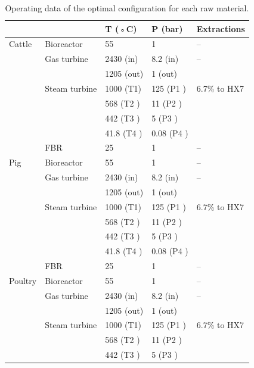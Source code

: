 \begin{refsection}[referencesCh2]
\begin{table}[h!]
	\centering
	\caption{Operating data of the optimal configuration for each raw material.}
	\label{table:Table4}
	\begin{tabular}{@{}lllll@{}}
		\toprule
		&               & T (◦C)      & P (bar)    & Extractions  \\ \midrule
		Cattle  & Bioreactor    & 55          & 1          & –            \\
		& Gas turbine   & 2430 (in)   & 8.2 (in)   & –            \\
		&               & 1205 (out)  & 1 (out)    &              \\
		& Steam turbine & 1000 (T1)   & 125 (P1 )  & 6.7\% to HX7 \\
		&               & 568 (T2 )   & 11 (P2 )   &              \\
		&               & 442 (T3 )   & 5 (P3 )    &              \\
		&               & 41.8 (T4 )  & 0.08 (P4 ) &              \\
		& FBR           & 25          & 1          & –            \\
		Pig     & Bioreactor    & 55          & 1          & –            \\
		& Gas turbine   & 2430 (in)   & 8.2 (in)   & –            \\
		&               & 1205 (out)  & 1 (out)    &              \\
		& Steam turbine & 1000 (T1)   & 125 (P1 )  & 6.7\% to HX7 \\
		&               & 568 (T2 )   & 11 (P2 )   &              \\
		&               & 442 (T3 )   & 5 (P3 )    &              \\
		&               & 41.8 (T4 )  & 0.08 (P4 ) &              \\
		& FBR           & 25          & 1          & –            \\
		Poultry & Bioreactor    & 55          & 1          & –            \\
		& Gas turbine   & 2430 (in)   & 8.2 (in)   & –            \\
		&               & 1205 (out)  & 1 (out)    &              \\
		& Steam turbine & 1000 (T1)   & 125 (P1 )  & 6.7\% to HX7 \\
		&               & 568 (T2 )   & 11 (P2 )   &              \\
		&               & 442 (T3 )   & 5 (P3 )    &              \\

\end{tabular}
\end{table}
\end{refsection}
